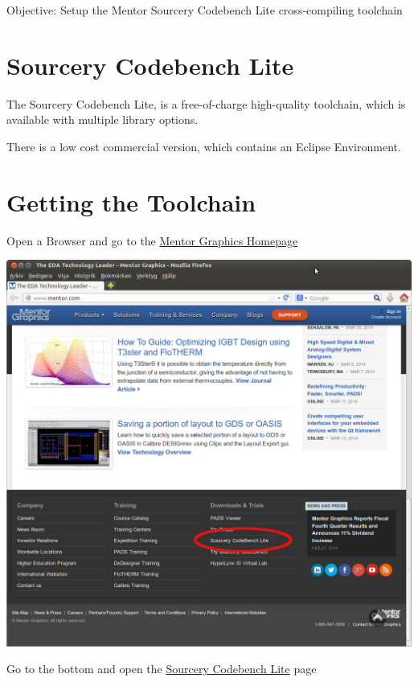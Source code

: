   {Objective: Setup the Mentor Sourcery Codebench Lite cross-compiling toolchain}

\section{Sourcery Codebench Lite}
The Sourcery Codebench Lite, is a free-of-charge high-quality toolchain,
which is available with multiple library options.

There is a low cost commercial version, which contains an Eclipse Environment.
\clearpage
\section{Getting the Toolchain}

Open a Browser and go to the \href{http://www.mentor.com/}{Mentor Graphics Homepage} \\
\begin{center}
  \includegraphics[width=\textwidth]{labs/setup-codesourcery/Mentor_Homepage.png}
\end{center}

Go to the bottom and open the \href{http://www.mentor.com/embedded-software/sourcery-tools/sourcery-codebench/editions/lite-edition.html}{Sourcery Codebench Lite} page
\clearpage

